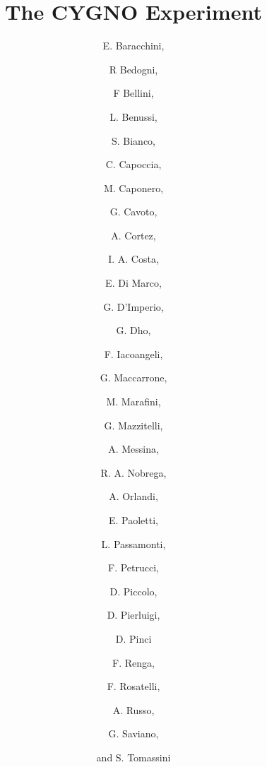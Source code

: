 \documentclass[review]{elsarticle}
\begin{document}
\begin{frontmatter}

\title{The CYGNO Experiment}

 



\author[a,b]{E. Baracchini,} 
\author[c]{R Bedogni,} 
\author[e,f]{F Bellini,} 
\author[c]{L. Benussi,}
\author[c]{S. Bianco,}
\author[c]{C. Capoccia,} 
\author[c,d]{M. Caponero,}
\author[e,f]{G. Cavoto,}
\author[a,b]{A. Cortez,}
\author[g]{I. A. Costa,}
\author[e]{E. Di Marco,}
\author[e]{G. D'Imperio,}
\author[a,b]{G. Dho,}
\author[e]{F. Iacoangeli,}
\author[c]{G. Maccarrone,}
\author[e,h]{M. Marafini,}
\author[c]{G. Mazzitelli,}
\author[e,f]{A. Messina,}
\author[g]{R. A. Nobrega,}
\author[c]{A. Orlandi,}
\author[c]{E. Paoletti,}
\author[c]{L. Passamonti,}
\author[i,j]{F. Petrucci,}
\author[c]{D. Piccolo,}
\author[c]{D. Pierluigi,}
\author[e]{D. Pinci}
\author[e]{F. Renga,}
\author[c]{F. Rosatelli,}
\author[c]{A. Russo,}
\author[c,k]{G. Saviano,}
\author[c]{and S. Tomassini}


\address[a]{Gran~Sasso~Science~Institute,\\ L'Aquila, I-67100, Italy}
\address[b]{Istituto Nazionale di Fisica Nucleare,\\ Laboratori Nazionali del Gran Sasso, Assergi, Italy}
\address[c]{Istituto Nazionale di Fisica Nucleare ,\\  Laboratori Nazionali di Frascati, I-00044, Italy}
\address[d]{ENEA Centro Ricerche Frascati, Frascati, Italy}
\address[e]{Istituto~Nazionale~di~Fisica~Nucleare,\\ Sezione di Roma, I-00185, Italy}
\address[f]{Dipartimento di Fisica Sapienza Universit\`a di Roma, I-00185, Italy} 
\address[g]{Universidade Federal de Juiz de Fora, Juiz de Fora, Brasil}
\address[h]{Museo Storico della Fisica e Centro Studi e Ricerche "Enrico Fermi",\\ Piazza del Viminale 1, Roma, I-00184, Italy}
\address[i]{Dipartimento di Matematica e Fisica, Universit\`a Roma TRE, Roma, Italy}
\address[j]{Istituto Nazionale di Fisica Nucleare, Sezione di Roma TRE, Roma, Italy}
\address[k]{Dipartimento di Ingegneria Chimica, Materiali e Ambiente, Sapienza Universit\`a di Roma, Roma, Italy}



\end{frontmatter}
\end{document}
